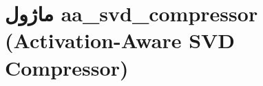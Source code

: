 \section{ماژول aa\_svd\_compressor (Activation-Aware SVD Compressor)}
\label{sec:module_aa_svd_compressor}
